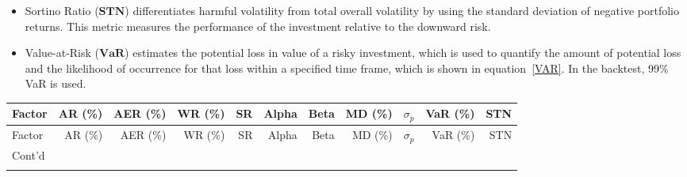 \documentclass[preprint,12pt]{elsarticle}
\begin{document}
\begin{itemize}[label={\textbullet}]
  \item Sortino Ratio ($\textbf{STN}$) differentiates harmful volatility from total overall volatility by using the standard deviation of negative portfolio returns. This metric measures the performance of the investment relative to the downward risk.
  \item Value-at-Risk ($\textbf{VaR}$) estimates the potential loss in value of a risky investment, which is used to quantify the amount of potential loss and the likelihood of occurrence for that loss within a specified time frame, which is shown in equation~\eqref{VAR}. In the backtest, 99$\%$VaR is used. 
\end{itemize}
 
{\tiny
\renewcommand{\arraystretch}{1} 
\begin{longtable}{lrrrrrrrrrr}
\toprule               Factor &  AR (\%) &  AER (\%) &  WR (\%) &  SR &  Alpha &  Beta &  MD (\%) &    $\sigma_p$ & VaR (\%) & STN \\
\midrule
\endfirsthead

\toprule
               Factor &  AR (\%) &  AER (\%) &  WR (\%) &  SR &  Alpha &  Beta &  MD (\%) &    $\sigma_p$ & VaR (\%) & STN \\
\midrule
\endhead
\midrule
\multicolumn{1}{l}{{Cont'd}} \\
\midrule
\endfoot


\end{longtable}}
\end{document}
